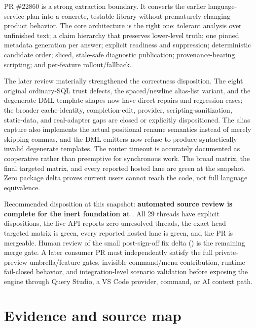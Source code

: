 \documentclass[11pt]{article}
\newcommand{\code}[1]{\texttt{\detokenize{#1}}}
\begin{document}
\begin{takeawaybox}
PR \#22860 is a strong extraction boundary. It converts the earlier language-service plan into a concrete, testable library without prematurely changing product behavior. The core architecture is the right one: tolerant analysis over unfinished text; a claim hierarchy that preserves lower-level truth; one pinned metadata generation per answer; explicit readiness and suppression; deterministic candidate order; sliced, stale-safe diagnostic publication; provenance-bearing scripting; and per-feature rollout/fallback.

The later review materially strengthened the correctness disposition. The eight original ordinary-SQL trust defects, the spaced/newline alias-list variant, and the degenerate-DML template shapes now have direct repairs and regression cases; the broader cache-identity, completion-edit, provider, scripting-sanitization, static-data, and real-adapter gaps are closed or explicitly dispositioned. The alias capture also implements the actual positional rename semantics instead of merely skipping commas, and the DML emitters now refuse to produce syntactically invalid degenerate templates. The router timeout is accurately documented as cooperative rather than preemptive for synchronous work. The broad matrix, the final targeted matrix, and every reported hosted lane are green at the snapshot. Zero package delta proves current users cannot reach the code, not full language equivalence.
\end{takeawaybox}

\begin{statusbox}[title={Decision statement}]
Recommended disposition at this snapshot: \textbf{automated source review is complete for the inert foundation at \code{2a54ec071}}. All 29 threads have explicit dispositions, the live API reports zero unresolved threads, the exact-head targeted matrix is green, every reported hosted lane is green, and the PR is mergeable. Human review of the small post-sign-off fix delta (\code{b66db2d8f..2a54ec071}) is the remaining merge gate. A later consumer PR must independently satisfy the full private-preview umbrella/feature gates, invisible command/menu contribution, runtime fail-closed behavior, and integration-level scenario validation before exposing the engine through Query Studio, a VS Code provider, command, or AI context path.
\end{statusbox}

\section*{Evidence and source map}
\end{document}
